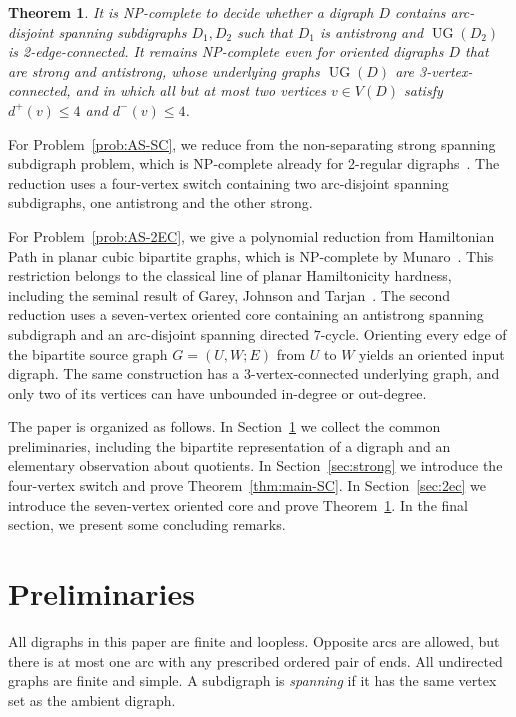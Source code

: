 \documentclass[12pt]{article}
\newtheorem{theorem}{Theorem}
\theoremstyle{remark}
\newcommand{\UG}{\operatorname{UG}}
\begin{document}
\begin{theorem}\label{thm:main-2EC}
It is NP-complete to decide whether a digraph $D$ contains
arc-disjoint spanning subdigraphs $D_1,D_2$ such that $D_1$ is antistrong and $\UG(D_2)$ is 2-edge-connected. It remains NP-complete even for oriented digraphs $D$ that are strong and antistrong, whose underlying graphs $\UG(D)$ are
3-vertex-connected, and in which all but at most two vertices $v\in V(D)$ satisfy
$d^+(v)\leq4$ and $d^-(v)\leq4$.
\end{theorem}

For Problem~\ref{prob:AS-SC}, we reduce from the non-separating strong spanning subdigraph problem, which is NP-complete already for 2-regular digraphs~\cite{BY}.  The reduction uses a four-vertex switch containing two arc-disjoint spanning subdigraphs, one antistrong and the other strong.

For Problem~\ref{prob:AS-2EC}, we give a polynomial reduction from Hamiltonian Path in planar cubic bipartite graphs, which is
NP-complete by Munaro~\cite[Theorem~23]{Munaro}. This restriction
belongs to the classical line of planar Hamiltonicity hardness, including the seminal result of Garey, Johnson and Tarjan~\cite{GJT}.  The second reduction uses a seven-vertex oriented core containing an antistrong spanning subdigraph and an
arc-disjoint spanning directed $7$-cycle.  Orienting every edge of
the bipartite source graph $G=(U,W;E)$ from $U$ to $W$ yields an oriented input digraph. The same construction has a
3-vertex-connected underlying graph, and only two of its vertices can have unbounded in-degree or out-degree.

The paper is organized as follows. In Section~\ref{sec:prelim} we collect the common preliminaries, including the bipartite representation of a digraph and an elementary observation about quotients.  In Section~\ref{sec:strong} we introduce the four-vertex switch and prove Theorem~\ref{thm:main-SC}. In
Section~\ref{sec:2ec} we introduce the seven-vertex oriented core and prove Theorem~\ref{thm:main-2EC}.  In the final section, we present some concluding remarks.

\section{Preliminaries}\label{sec:prelim}

All digraphs in this paper are finite and loopless.  Opposite arcs are allowed, but there is at most one arc with any prescribed ordered pair of ends.  All undirected graphs are finite and simple.
A subdigraph is \emph{spanning} if it has the same vertex set as the ambient digraph.
\end{document}
